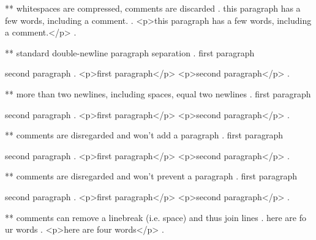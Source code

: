 ** whitespaces are compressed, comments are discarded
.
   this     paragraph  has a    few 
 words,   including
a comment.
.
<p>this paragraph has a few words, including a comment.</p>
.


** standard double-newline paragraph separation
.
first paragraph

second paragraph
.
<p>first paragraph</p>
<p>second paragraph</p>
.



** more than two newlines, including spaces, equal two newlines
.
first paragraph

   
  


second paragraph
.
<p>first paragraph</p>
<p>second paragraph</p>
.


** comments are disregarded and won't add a paragraph
.
first paragraph




second paragraph
.
<p>first paragraph</p>
<p>second paragraph</p>
.

** comments are disregarded and won't prevent a paragraph
.
first paragraph %

second paragraph
.
<p>first paragraph</p>
<p>second paragraph</p>
.


** comments can remove a linebreak (i.e. space) and thus join lines
.
here are fo%
ur words
.
<p>here are four words</p>
.
